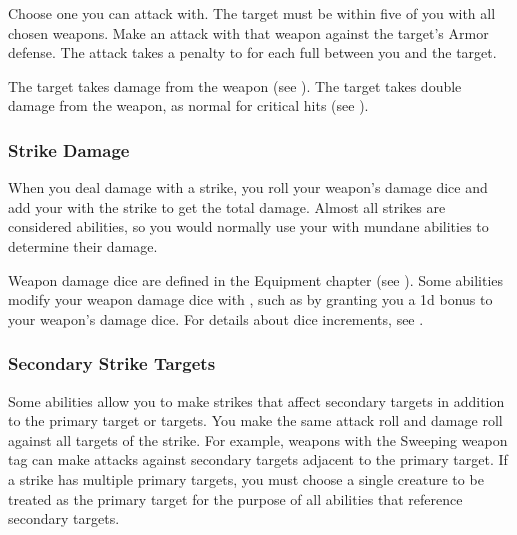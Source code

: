         \begin{freeability}{}
            Choose one  you can attack with.
            The target must be within five  of you with all chosen weapons.
            Make an attack with that weapon against the target's Armor defense.
            The attack takes a  penalty to  for each full  between you and the target.

            \hit The target takes damage from the weapon (see ).
            \crit The target takes double damage from the weapon, as normal for critical hits (see ).
        \end{freeability}

        \subsubsection{Strike Damage}\label{Strike Damage}
            When you deal damage with a strike, you roll your weapon's damage dice and add your  with the strike to get the total damage.
            Almost all strikes are considered  abilities, so you would normally use your  with mundane abilities to determine their damage.

            Weapon damage dice are defined in the Equipment chapter (see ).
            Some abilities modify your weapon damage dice with , such as by granting you a \plus1d bonus to your weapon's damage dice.
            For details about dice increments, see .

        \subsubsection{Secondary Strike Targets}\label{Secondary Strike Targets}
            Some abilities allow you to make strikes that affect secondary targets in addition to the primary target or targets.
            You make the same attack roll and damage roll against all targets of the strike.
            For example, weapons with the Sweeping weapon tag can make attacks against secondary targets adjacent to the primary target.
            If a strike has multiple primary targets, you must choose a single creature to be treated as the primary target for the purpose of all abilities that reference secondary targets.

